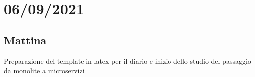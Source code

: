 \section{06/09/2021}
\subsection{Mattina}
Preparazione del template in latex per il diario e inizio dello studio del passaggio da monolite a microservizi.